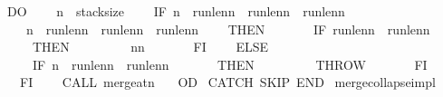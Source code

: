 \begin{isabellebody}
\ \ DO\isanewline
\ \ \ \ {\isasymacute}n\ {\isacharcolon}{\isacharequal}{\isacharequal}\ {\isasymacute}stack{\isacharunderscore}size{\isacharminus}{}{\isacharsemicolon}{\isacharsemicolon}\isanewline
\ \ \ \ IF\ {\isacharparenleft}{\isasymacute}n{\isachargreater}{}\ {\isasymand}\ {\isasymacute}run{\isacharunderscore}len{\isacharbang}{\isacharparenleft}{\isasymacute}n{\isacharminus}{}{\isacharparenright}\ {\isasymle}\ {\isasymacute}run{\isacharunderscore}len{\isacharbang}{\isasymacute}n\ {\isacharplus}\ {\isasymacute}run{\isacharunderscore}len{\isacharbang}{\isacharparenleft}{\isasymacute}n{\isacharplus}{}{\isacharparenright}{\isacharparenright}\isanewline
\ \ \ \ {\isasymor}\ {\isacharparenleft}{\isasymacute}n{\isachargreater}{}\ {\isasymand}\ {\isasymacute}run{\isacharunderscore}len{\isacharbang}{\isacharparenleft}{\isasymacute}n{\isacharminus}{}{\isacharparenright}\ {\isasymle}\ {\isasymacute}run{\isacharunderscore}len{\isacharbang}{\isacharparenleft}{\isasymacute}n{\isacharminus}{}{\isacharparenright}\ {\isacharplus}\ {\isasymacute}run{\isacharunderscore}len{\isacharbang}{\isasymacute}n{\isacharparenright}\isanewline
\ \ \ \ THEN\ \isanewline
\ \ \ \ \ \ IF\ {\isasymacute}run{\isacharunderscore}len{\isacharbang}{\isacharparenleft}{\isasymacute}n{\isacharminus}{}{\isacharparenright}\ {\isacharless}\ {\isasymacute}run{\isacharunderscore}len{\isacharbang}{\isacharparenleft}{\isasymacute}n{\isacharplus}{}{\isacharparenright}\ \isanewline
\ \ \ \ \ \ THEN\ \isanewline
\ \ \ \ \ \ \ \ {\isasymacute}n{\isacharcolon}{\isacharequal}{\isacharequal}{\isasymacute}n{\isacharminus}{}\ \isanewline
\ \ \ \ \ \ FI\isanewline
\ \ \ \ ELSE\ \isanewline
\ \ \ \ \ \ IF\ {\isasymacute}n{\isacharless}{}\ {\isasymor}\ {\isasymacute}run{\isacharunderscore}len{\isacharbang}{\isasymacute}n\ {\isachargreater}\ {\isasymacute}run{\isacharunderscore}len{\isacharbang}{\isacharparenleft}{\isasymacute}n{\isacharplus}{}{\isacharparenright}\ \isanewline
\ \ \ \ \ \ THEN\ \isanewline
\ \ \ \ \ \ \ \ THROW\ \isanewline
\ \ \ \ \ \ FI\isanewline
\ \ \ \ FI{\isacharsemicolon}{\isacharsemicolon}\isanewline
\ \ \ \ CALL\ merge{\isacharunderscore}at{\isacharparenleft}{\isasymacute}n{\isacharparenright}\ \isanewline
\ \ OD\ \isanewline
CATCH\ SKIP\ END{\isachardoublequoteclose}\isanewline
\isanewline
{}\isamarkupfalse%
\ merge{\isacharunderscore}collapse{\isacharunderscore}impl\isanewline
\isanewline
{}\isamarkupfalse%

\end{isabellebody}
